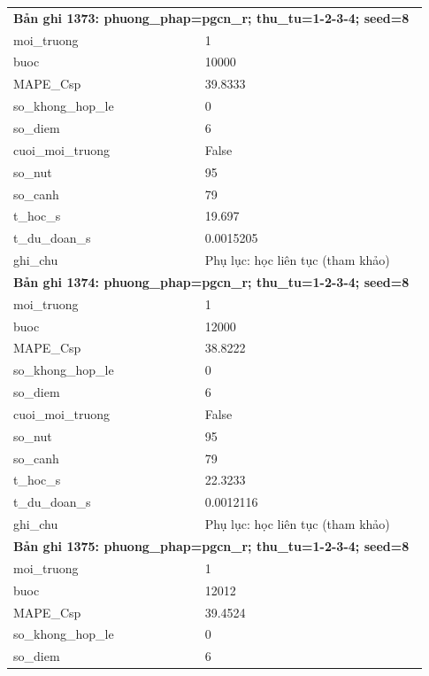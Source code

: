 \begin{longtable}{p{0.43\linewidth}p{0.50\linewidth}}
\midrule
\multicolumn{2}{p{0.95\linewidth}}{\textbf{Bản ghi 1373: phuong\_phap=pgcn\_r; thu\_tu=1-2-3-4; seed=8}} \\
moi\_\allowbreak truong & 1 \\
buoc & 10000 \\
MAPE\_\allowbreak Csp & 39.8333 \\
so\_\allowbreak khong\_\allowbreak hop\_\allowbreak le & 0 \\
so\_\allowbreak diem & 6 \\
cuoi\_\allowbreak moi\_\allowbreak truong & False \\
so\_\allowbreak nut & 95 \\
so\_\allowbreak canh & 79 \\
t\_\allowbreak hoc\_\allowbreak s & 19.697 \\
t\_\allowbreak du\_\allowbreak doan\_\allowbreak s & 0.0015205 \\
ghi\_\allowbreak chu & Phụ lục: học liên tục (tham khảo) \\
\midrule
\multicolumn{2}{p{0.95\linewidth}}{\textbf{Bản ghi 1374: phuong\_phap=pgcn\_r; thu\_tu=1-2-3-4; seed=8}} \\
moi\_\allowbreak truong & 1 \\
buoc & 12000 \\
MAPE\_\allowbreak Csp & 38.8222 \\
so\_\allowbreak khong\_\allowbreak hop\_\allowbreak le & 0 \\
so\_\allowbreak diem & 6 \\
cuoi\_\allowbreak moi\_\allowbreak truong & False \\
so\_\allowbreak nut & 95 \\
so\_\allowbreak canh & 79 \\
t\_\allowbreak hoc\_\allowbreak s & 22.3233 \\
t\_\allowbreak du\_\allowbreak doan\_\allowbreak s & 0.0012116 \\
ghi\_\allowbreak chu & Phụ lục: học liên tục (tham khảo) \\
\midrule
\multicolumn{2}{p{0.95\linewidth}}{\textbf{Bản ghi 1375: phuong\_phap=pgcn\_r; thu\_tu=1-2-3-4; seed=8}} \\
moi\_\allowbreak truong & 1 \\
buoc & 12012 \\
MAPE\_\allowbreak Csp & 39.4524 \\
so\_\allowbreak khong\_\allowbreak hop\_\allowbreak le & 0 \\
so\_\allowbreak diem & 6 \\

\end{longtable}
